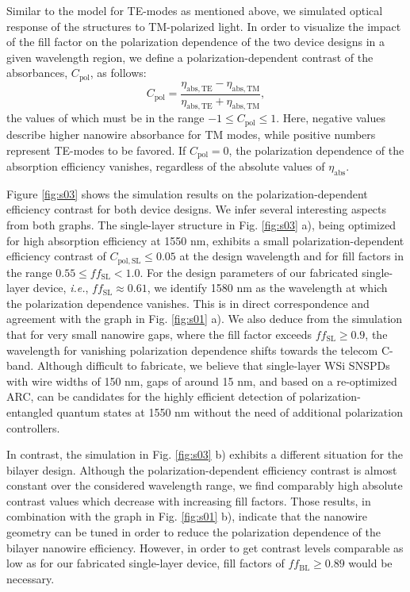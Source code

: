 \documentclass[aip,apl,showpacs,showkeys,preprint,superscriptaddress,preprintnumbers,amsmath,amssymb]{revtex4-1}
\begin{document}
\begin{bibunit}
Similar to the model for TE-modes as mentioned above, we simulated optical response of the structures to TM-polarized light. In order to visualize the impact of the fill factor on the polarization dependence of the two device designs in a given wavelength region, we define a polarization-dependent contrast of the absorbances, $C_\mathrm{pol}$, as follows:
\begin{equation*}
C_\mathrm{pol}=\frac{\eta_\mathrm{abs,TE}-\eta_\mathrm{abs,TM}}{\eta_\mathrm{abs,TE}+\eta_\mathrm{abs,TM}},
\end{equation*}
the values of which must be in the range $-1\le C_\mathrm{pol}\le1$. Here, negative values describe higher nanowire absorbance for TM modes, while positive numbers represent TE-modes to be favored. If $C_\mathrm{pol}=0$, the polarization dependence of the absorption efficiency vanishes, regardless of the absolute values of $\eta_\mathrm{abs}$.

Figure \ref{fig:s03} shows the simulation results on the polarization-dependent efficiency contrast for both device designs. We infer several interesting aspects from both graphs. The single-layer structure in Fig. \ref{fig:s03} a), being optimized for high absorption efficiency at 1550 nm, exhibits a small polarization-dependent efficiency contrast of $C_\mathrm{pol,SL}\le0.05$ at the design wavelength and for fill factors in the range $0.55\le ff_\mathrm{SL}<1.0$. For the design parameters of our fabricated single-layer device, \textit{i.e.}, $ff_\mathrm{SL}\approx0.61$, we identify 1580 nm as the wavelength at which the polarization dependence vanishes. This is in direct correspondence and agreement with the graph in Fig. \ref{fig:s01} a). We also deduce from the simulation that for very small nanowire gaps, where the fill factor exceeds $ff_\mathrm{SL}\ge0.9$, the wavelength for vanishing polarization dependence shifts towards the telecom C-band. Although difficult to fabricate, we believe that single-layer WSi SNSPDs with wire widths of 150 nm, gaps of around 15 nm, and based on a re-optimized ARC, can be candidates for the highly efficient detection of polarization-entangled quantum states at 1550 nm without the need of additional polarization controllers.

In contrast, the simulation in Fig. \ref{fig:s03} b) exhibits a different situation for the bilayer design. Although the polarization-dependent efficiency contrast is almost constant over the considered wavelength range, we find comparably high absolute contrast values which decrease with increasing fill factors. Those results, in combination with the graph in Fig. \ref{fig:s01} b), indicate that the nanowire geometry can be tuned in order to reduce the polarization dependence of the bilayer nanowire efficiency. However, in order to get contrast levels comparable as low as for our fabricated single-layer device, fill factors of $ff_\mathrm{BL}\ge0.89$ would be necessary.



\end{bibunit}
\end{document}
